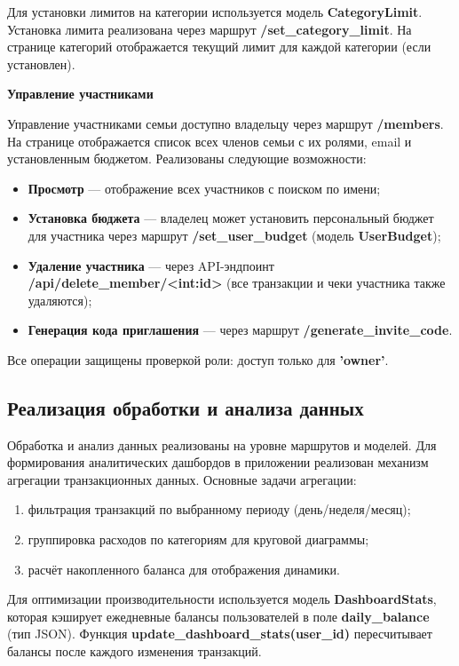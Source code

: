 Для установки лимитов на категории используется модель \textbf{CategoryLimit}. Установка лимита реализована через маршрут \textbf{/set\_category\_limit}. На странице категорий отображается текущий лимит для каждой категории (если установлен).

\textbf{Управление участниками}

Управление участниками семьи доступно владельцу через маршрут \textbf{/members}. На странице отображается список всех членов семьи с их ролями, email и установленным бюджетом. Реализованы следующие возможности:
\begin{itemize}
    \item \textbf{Просмотр} --- отображение всех участников с поиском по имени;
    \item \textbf{Установка бюджета} --- владелец может установить персональный бюджет для участника через маршрут \textbf{/set\_user\_budget} (модель \textbf{UserBudget});
    \item \textbf{Удаление участника} --- через API-эндпоинт \textbf{/api/delete\_member/<int:id>} (все транзакции и чеки участника также удаляются);
    \item \textbf{Генерация кода приглашения} --- через маршрут \textbf{/generate\_invite\_code}.
\end{itemize}

Все операции защищены проверкой роли: доступ только для \textbf{'owner'}.


\subsection{Реализация обработки и анализа данных}

Обработка и анализ данных реализованы на уровне маршрутов и моделей. Для формирования аналитических дашбордов в приложении реализован механизм агрегации транзакционных данных. Основные задачи агрегации:
\begin{enumerate}
    \item фильтрация транзакций по выбранному периоду (день/неделя/месяц);
    \item группировка расходов по категориям для круговой диаграммы;
    \item расчёт накопленного баланса для отображения динамики.
\end{enumerate}

Для оптимизации производительности используется модель \textbf{DashboardStats}, которая кэширует ежедневные балансы пользователей в поле \textbf{daily\_balance} (тип JSON). Функция \textbf{update\_dashboard\_stats(user\_id)} пересчитывает балансы после каждого изменения транзакций.

